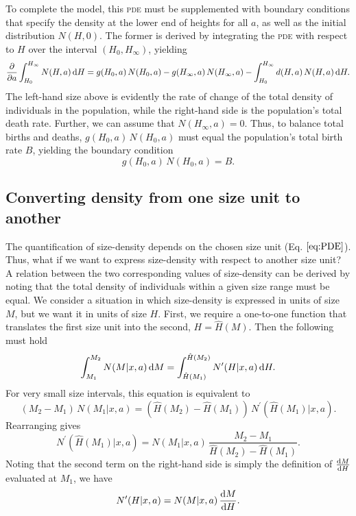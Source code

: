 \documentclass[10pt,twoside]{article}
\begin{document}
To complete the model, this \textsc{pde} must be supplemented with boundary
conditions that specify the density at the lower end of heights
for all \(a\), as well as the initial distribution
\(N(H,0)\). The former is derived by integrating the \textsc{pde} with respect to
\(H\) over the interval \((H_{0}, H_{\infty} )\), yielding
\begin{equation}\frac{\partial}{\partial a} \int _{H_{0} }^{H_{\infty}}N(H, a) \, {\rm d} H = g(H_{0} , a) \, N(H_{0} , a) - g(H_{\infty}, a) \, N(H_{\infty}, a) - \int _{H_{0} }^{H_{\infty}}d (H, a) \, N(H, a) \, {\rm d} H.
\end{equation}
The left-hand size above is evidently the rate of change of the total
density of individuals in the population, while the right-hand side is
the population's total death rate. Further, we can assume that \(N(H_{\infty}, a) = 0\). Thus,
to balance total births and deaths, \(g(H_{0} , a) \, N(H_{0} , a)\) must
equal the population's total birth rate \(B\), yielding the boundary condition
\begin{equation} g(H_{0} , a) \, N(H_{0} , a) = B.
\end{equation}

\subsection{Converting density from one size unit to
another}\label{converting-density-from-one-size-unit-to-another}

The quantification of size-density depends on the chosen size
unit (Eq. \(\ref{eq:PDE}\)). Thus, what if we want to express size-density with respect to
another size unit? A relation between the two corresponding values of size-density can be derived
by noting that the total density of individuals within a given size range
must be equal. We consider a situation in which size-density is expressed in units of size \(M\),
but we want it in units of size \(H\). First, we require a
one-to-one function that translates the first size unit into the second, \(H = \hat{H}(M)\). Then
the following must hold
\begin{equation} \label{eq:n_conversion} \int_{M_1}^{M_2} N(M | x, a) \, {\rm d}M = \int_{\hat{H}(M_1)}^{\hat{H}(M_2)} N^\prime(H | x, a) \, {\rm d}H .
\end{equation}
For very small size intervals, this equation is equivalent to
\begin{equation} \left(M_2 - M_1 \right) \, N(M_1 | x, a) = \left( \hat{H}(M_2) - \hat{H}(M_1)\right) \, N^\prime(\hat{H}(M_1) | x, a).
\end{equation}
Rearranging gives
\begin{equation} N^\prime(\hat{H}(M_1) | x, a) = N(M_1 | x, a) \, \frac{M_2 - M_1}{\hat{H}(M_2) - \hat{H}(M_1)}.
\end{equation}
Noting that the second term on the right-hand side is simply the definition of
\(\frac{{\rm d} M}{{\rm d} H}\) evaluated at \(M_1\), we have
\begin{equation} \label{eq:n_conversion2} N^\prime(H | x, a) = N(M | x, a) \, \frac{{\rm d} M}{{\rm d} H}.
\end{equation}

\clearpage

\end{document}
